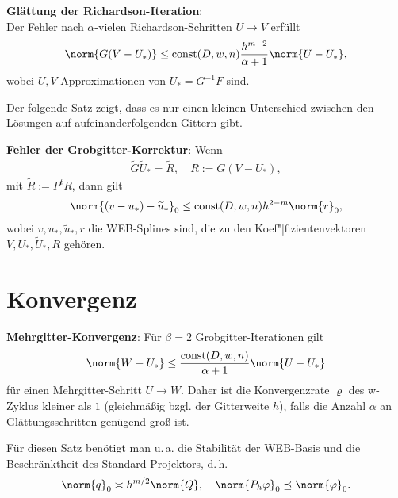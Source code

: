 \textbf{Glättung der Richardson-Iteration}:\\
Der Fehler nach $\alpha$-vielen Richardson-Schritten $U \rightarrow V$ erfüllt
\begin{align*}
    \norm{G (V - U_\ast)} \le \const(D, w, n) \frac{h^{m-2}}{\alpha+1} \norm{U - U_\ast},
\end{align*}
wobei $U, V$ Approximationen von $U_\ast = G^{-1} F$ sind.

\linie
\pagebreak

Der folgende Satz zeigt, dass es nur einen kleinen Unterschied zwischen den Lösungen
auf aufeinanderfolgenden Gittern gibt.

\textbf{Fehler der Grobgitter-Korrektur}:
Wenn
\begin{align*}
    \widetilde{G} \widetilde{U}_\ast = \widetilde{R},\quad
    R := G(V - U_\ast),
\end{align*}
mit $\widetilde{R} := P^t R$,
dann gilt
\begin{align*}
    \norm{(v - u_\ast) - \widetilde{u}_\ast}_0 \le \const(D, w, n) h^{2-m} \norm{r}_0,
\end{align*}
wobei $v, u_\ast, \widetilde{u}_\ast, r$ die WEB-Splines sind, die zu den Koef"|fizientenvektoren
$V, U_\ast, \widetilde{U}_\ast, R$ gehören.

\section{%
    Konvergenz%
}

\textbf{Mehrgitter-Konvergenz}:
Für $\beta = 2$ Grobgitter-Iterationen gilt
\begin{align*}
    \norm{W - U_\ast} \le \frac{\const(D, w, n)}{\alpha + 1} \norm{U - U_\ast}
\end{align*}
für einen Mehrgitter-Schritt $U \rightarrow W$.
Daher ist die Konvergenzrate $\varrho$ des w-Zyklus kleiner als $1$
(gleichmäßig bzgl. der Gitterweite $h$), falls die Anzahl $\alpha$ an Glättungsschritten
genügend groß ist.

Für diesen Satz benötigt man u.\,a. die Stabilität der WEB-Basis
und die Beschränktheit des Standard-Projektors, d.\,h.
\begin{align*}
    \norm{q}_0 \asymp h^{m/2} \norm{Q},\quad
    \norm{P_h \varphi}_0 \preceq \norm{\varphi}_0.
\end{align*}

\pagebreak
